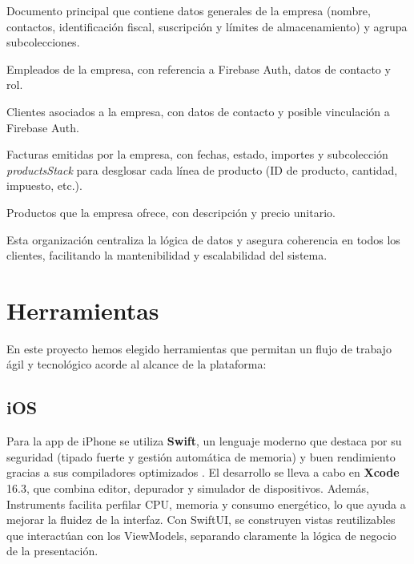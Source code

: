\begin{large}
\begin{description}[leftmargin=3cm, style=nextline]
  \item[\textit{businesses/\{businessId\}}] Documento principal que contiene datos generales de la empresa (nombre, contactos, identificación fiscal, suscripción y límites de almacenamiento) y agrupa subcolecciones.
  \item[\textit{businesses/\{businessId\}/employees/\{employeeId\}}] Empleados de la empresa, con referencia a Firebase Auth, datos de contacto y rol.
  \item[\textit{businesses/\{businessId\}/clients/\{clientId\}}] Clientes asociados a la empresa, con datos de contacto y posible vinculación a Firebase Auth.
  \item[\textit{businesses/\{businessId\}/invoices/\{invoiceId\}}] Facturas emitidas por la empresa, con fechas, estado, importes y subcolección \textit{productsStack} para desglosar cada línea de producto (ID de producto, cantidad, impuesto, etc.).
  \item[\textit{businesses/\{businessId\}/products/\{productId\}}] Productos que la empresa ofrece, con descripción y precio unitario.
\end{description}

Esta organización centraliza la lógica de datos y asegura coherencia en todos los clientes, facilitando la mantenibilidad y escalabilidad del sistema.

\end{large}

\section{Herramientas}

\begin{large}

En este proyecto hemos elegido herramientas que permitan un flujo de trabajo ágil y tecnológico acorde al alcance de la plataforma:

\end{large}

\subsection{iOS}

\begin{large}

Para la app de iPhone se utiliza \textbf{Swift}, un lenguaje moderno que destaca por su seguridad (tipado fuerte y gestión automática de memoria) y buen rendimiento gracias a sus compiladores optimizados \cite{swift_lang2025}. El desarrollo se lleva a cabo en \textbf{Xcode} 16.3, que combina editor, depurador y simulador de dispositivos. Además, Instruments facilita perfilar CPU, memoria y consumo energético, lo que ayuda a mejorar la fluidez de la interfaz. Con SwiftUI, se construyen vistas reutilizables que interactúan con los ViewModels, separando claramente la lógica de negocio de la presentación.

\end{large}

